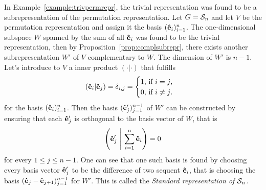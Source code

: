 In Example~\ref{example:trivpermrepr}, the trivial representation was found to be a subrepresentation of the permutation representation. Let $G= \mathcal{S}_n$ and let $V$ be the permutation representation and assign it the basis $(\mathbf{\hat{e}}_i)_{i=1}^n$. The one-dimensional subspace $W$ spanned by the sum of all $\mathbf{\hat{e}}_i$ was found to be the trivial representation, then by Proposition~\ref{prop:complsubrepr}, there exists another subrepresentation $W'$ of $V$ complementary to $W$. The dimension of $W'$ is $n-1$. Let's introduce to $V$ a inner product $(\cdot|\cdot)$ that fulfills
\begin{align*}
	(\mathbf{\hat{e}}_i|\mathbf{\hat{e}}_j) = \delta_{i,j} = \begin{cases}
		1 \text{, if $i=j$,}\\
		0 \text{, if $i \neq j$.}
	\end{cases}
\end{align*}
for the basis $(\mathbf{\hat{e}}_i)_{i=1}^n$. Then the basis $(\mathbf{\hat{e}}'_j)_{j=1}^{n-1}$ of $W'$ can be constructed by ensuring that each $\mathbf{\hat{e}}'_j$ is orthogonal to the basis vector of $W$, that is
\begin{align*}
	\left( \mathbf{\hat{e}}'_j \ \middle\vert \ \sum_{i=1}^n \mathbf{\hat{e}}_i \right) = 0
\end{align*}
for every $1 \leq j \leq n-1$. One can see that one such basis is found by choosing every basis vector $\mathbf{\hat{e}}'_j$ to be the difference of two sequent $\mathbf{\hat{e}}_i$, that is choosing the basis $(\mathbf{\hat{e}}_j - \mathbf{\hat{e}}_{j+1})_{j=1}^{n-1}$ for $W'$. This is called the \emph{Standard representation of $\mathcal{S}_n$.}

